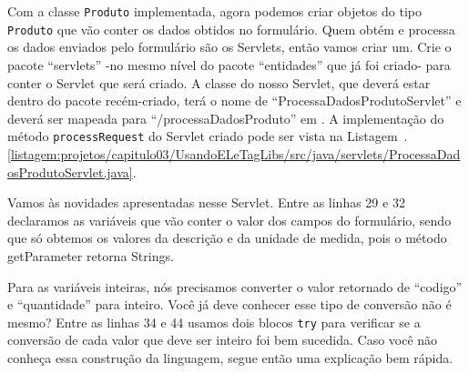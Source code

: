 
Com a classe \texttt{Produto} implementada, agora podemos criar objetos do tipo \texttt{Produto} que vão conter os dados obtidos no formulário. Quem obtém e processa os dados enviados pelo formulário são os Servlets, então vamos criar um. Crie o pacote ``servlets'' -no mesmo nível do pacote ``entidades'' que já foi criado- para conter o Servlet que será criado. A classe do nosso Servlet, que deverá estar dentro do pacote recém-criado, terá o nome de ``ProcessaDadosProdutoServlet'' e deverá ser mapeada para ``/processaDadosProduto'' em . A implementação do método \texttt{processRequest} do Servlet criado pode ser vista na Listagem~\thechapter.\ref{listagem:projetos/capitulo03/UsandoELeTagLibs/src/java/servlets/ProcessaDadosProdutoServlet.java}.


Vamos às novidades apresentadas nesse Servlet. Entre as linhas 29 e 32 declaramos as variáveis que vão conter o valor dos campos do formulário, sendo que só obtemos os valores da descrição e da unidade de medida, pois o método getParameter retorna Strings.

Para as variáveis inteiras, nós precisamos converter o valor retornado de ``codigo'' e ``quantidade'' para inteiro. Você já deve conhecer esse tipo de conversão não é mesmo? Entre as linhas 34 e 44 usamos dois blocos \texttt{try} para verificar se a conversão de cada valor que deve ser inteiro foi bem sucedida. Caso você não conheça essa construção da linguagem, segue então uma explicação bem rápida.

